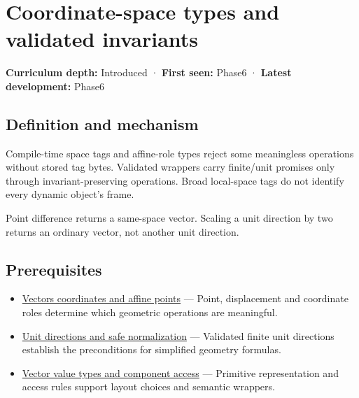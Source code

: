 \hypertarget{appendix-380a220e2529}{}\label{referencestart:appendix-380a220e2529}
\section{Coordinate-space types and validated invariants}\label{appendix-380a220e2529-coordinate-space-types-and-validated-invariants}

\textbf{Curriculum depth:} Introduced · \textbf{First seen:} Phase6 · \textbf{Latest development:} Phase6

\begin{allmightroledefinition}

\subsection{Definition and mechanism}\label{appendix-380a220e2529-definition-and-mechanism}

Compile-time space tags and affine-role types reject some meaningless operations without stored tag bytes. Validated wrappers carry finite/unit promises only through invariant-preserving operations. Broad local-space tags do not identify every dynamic object's frame.

\end{allmightroledefinition}

Point difference returns a same-space vector. Scaling a unit direction by two returns an ordinary vector, not another unit direction.

\subsection{Prerequisites}\label{appendix-380a220e2529-prerequisites}

\begin{itemize}
\tightlist
\item
  \hyperref[appendix-0659864c0aa3]{Vectors coordinates and affine points} --- Point, displacement and coordinate roles determine which geometric operations are meaningful.
\item
  \hyperref[appendix-f744e41b95b4]{Unit directions and safe normalization} --- Validated finite unit directions establish the preconditions for simplified geometry formulas.
\item
  \hyperref[appendix-37a39984ba66]{Vector value types and component access} --- Primitive representation and access rules support layout choices and semantic wrappers.
\end{itemize}

